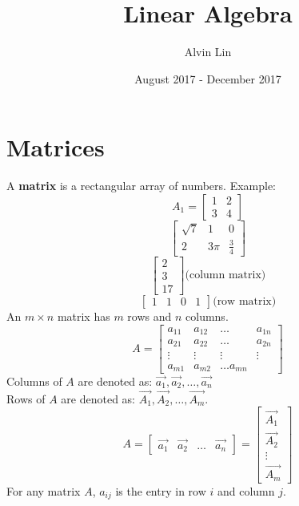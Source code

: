 \documentclass[letterpaper, 12pt]{math}
\title{Linear Algebra}
\author{Alvin Lin}
\date{August 2017 - December 2017}
\begin{document}
\maketitle

\section*{Matrices}
A \textbf{matrix} is a rectangular array of numbers. Example:
\[ A_1 = \begin{bmatrix}1 & 2 \\ 3 & 4\end{bmatrix} \]
\[ \begin{bmatrix}\sqrt{7} & 1 & 0 \\ 2 & 3\pi & \frac{3}{4}\end{bmatrix} \]
\[ \begin{bmatrix}2 \\ 3 \\ 17\end{bmatrix} \text{(column matrix)} \]
\[ \begin{bmatrix}1 & 1 & 0 & 1\end{bmatrix} \text{(row matrix)} \]
An \( m\times n \) matrix has \( m \) rows and \( n \) columns.
\[ A = \begin{bmatrix}
  a_{11} & a_{12} & \dots & a_{1n} \\
  a_{21} & a_{22} & \dots & a_{2n} \\
  \vdots & \vdots & \vdots & \vdots \\
  a_{m1} & a_{m2} & \dots a_{mn}
\end{bmatrix} \]
Columns of \( A \) are denoted as: \( \vec{a_1},\vec{a_2},\dots,\vec{a_n} \) \\
Rows of \( A \) are denoted as: \( \vec{A_1},\vec{A_2},\dots,\vec{A_m} \).
\[ A = \begin{bmatrix}\vec{a_1} & \vec{a_2} & \dots & \vec{a_n}\end{bmatrix} =
  \begin{bmatrix}\vec{A_1} \\ \vec{A_2} \\ \vdots \\ \vec{A_m}\end{bmatrix} \]
For any matrix \( A \), \( a_{ij} \) is the entry in row \( i \) and column
\( j \).
\end{document}
